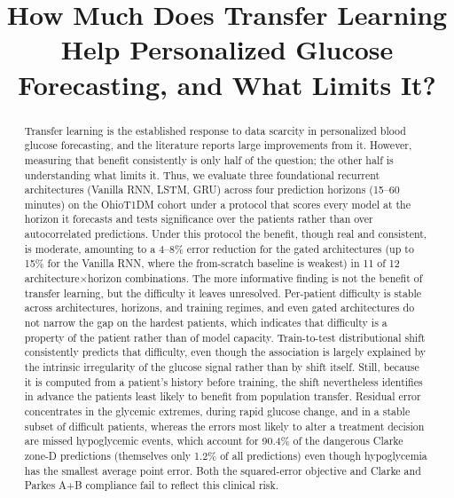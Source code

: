 \documentclass[conference]{IEEEtran}
\begin{document}
\title{How Much Does Transfer Learning Help Personalized Glucose Forecasting, and What Limits It?}


\maketitle
\begin{abstract}
Transfer learning is the established response to data scarcity in personalized
blood glucose forecasting, and the literature reports large improvements from
it. However, measuring that benefit consistently is only half of the question;
the other half is understanding what limits it. Thus, we evaluate three foundational
recurrent architectures (Vanilla RNN, LSTM, GRU) across four prediction
horizons (15--60 minutes) on the OhioT1DM cohort under a protocol that scores
every model at the horizon it forecasts and tests significance over the  patients
rather than over autocorrelated predictions. Under this protocol the benefit, 
though real and consistent, is moderate, amounting to a 4--8\% error reduction for the
gated architectures (up to 15\% for the Vanilla RNN, where the from-scratch
baseline is weakest) in 11 of 12 architecture$\times$horizon combinations. The more informative finding is not the benefit of transfer learning, but the difficulty it leaves unresolved. Per-patient difficulty is
stable across architectures, horizons, and training regimes, and even gated
architectures do not narrow the gap on the hardest patients, which indicates
that difficulty is a property of the patient rather than of model capacity.
Train-to-test distributional shift consistently predicts that difficulty,
even though the association is largely explained by the intrinsic irregularity of
the glucose signal rather than by shift itself. Still, because it is computed from a
patient's history before training, the shift nevertheless identifies in advance the
patients least likely to benefit from population transfer. Residual error
concentrates in the glycemic extremes, during rapid glucose change, and in a
stable subset of difficult patients, whereas the errors most likely to alter a
treatment decision are missed hypoglycemic events, which account for 90.4\% of
the dangerous Clarke zone-D predictions (themselves only 1.2\% of all predictions)
even though hypoglycemia has the smallest average point error. Both the squared-error objective and Clarke and Parkes A+B compliance fail to reflect this clinical risk.
\end{abstract}
\end{document}
